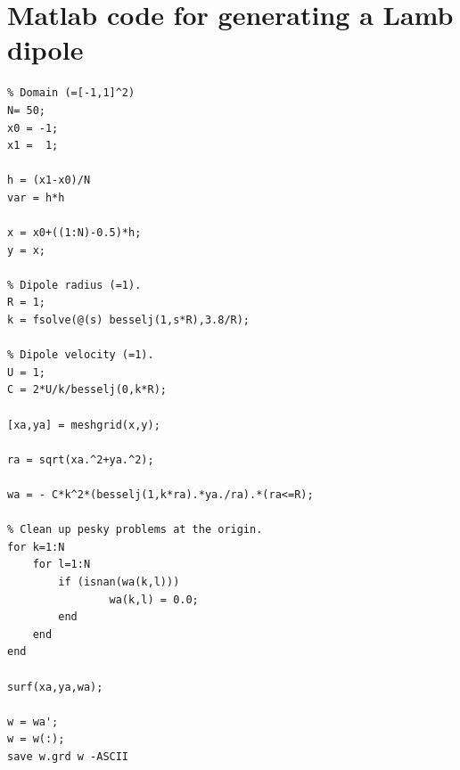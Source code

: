 \documentclass[12pt]{report}
\begin{document}
\chapter{Matlab code for generating a Lamb dipole}

\begin{verbatim}
% Domain (=[-1,1]^2)
N= 50;
x0 = -1;
x1 =  1;

h = (x1-x0)/N
var = h*h

x = x0+((1:N)-0.5)*h;
y = x;

% Dipole radius (=1).
R = 1;
k = fsolve(@(s) besselj(1,s*R),3.8/R);

% Dipole velocity (=1).
U = 1;
C = 2*U/k/besselj(0,k*R);

[xa,ya] = meshgrid(x,y);

ra = sqrt(xa.^2+ya.^2);

wa = - C*k^2*(besselj(1,k*ra).*ya./ra).*(ra<=R);

% Clean up pesky problems at the origin.
for k=1:N
    for l=1:N
        if (isnan(wa(k,l)))
                wa(k,l) = 0.0;
        end
    end
end

surf(xa,ya,wa);

w = wa';
w = w(:);
save w.grd w -ASCII
\end{verbatim}
\end{document}
